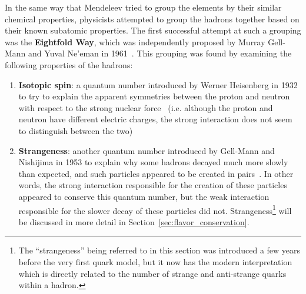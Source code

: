 In the same way that Mendeleev tried to group the elements by their similar chemical properties, physicists attempted to group the hadrons together based on their known subatomic properties. The first successful attempt at such a grouping was the \textbf{Eightfold Way}, which was independently proposed by Murray Gell-Mann and Yuval Ne'eman in 1961~\cite{GellMannEightfold, NeemanEightfold}. This grouping was found by examining the following properties of the hadrons:
%
\begin{enumerate}
    \item \textbf{Isotopic spin}: a quantum number introduced by Werner Heisenberg in 1932 to try to explain the apparent symmetries between the proton and neutron with respect to the strong nuclear force~\cite{IsotopicSpin} (i.e. although the proton and neutron have different electric charges, the strong interaction does not seem to distinguish between the two)
    \item \textbf{Strangeness}: another quantum number introduced by Gell-Mann and Nishijima in 1953 to explain why some hadrons decayed much more slowly than expected, and such particles appeared to be created in pairs~\cite{Strangeness}. In other words, the strong interaction responsible for the creation of these particles appeared to conserve this quantum number, but the weak interaction responsible for the slower decay of these particles did not. Strangeness\footnote{The ``strangeness'' being referred to in this section was introduced a few years before the very first quark model, but it now has the modern interpretation which is directly related to the number of strange and anti-strange quarks within a hadron.} will be discussed in more detail in Section~\ref{sec:flavor_conservation}.
\end{enumerate}
%
